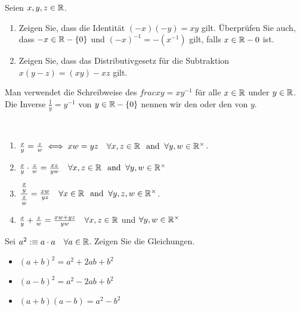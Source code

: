 \begin{imp-ex}
  Seien $x,y,z \in \mathbb{R}$.
  \begin{enumerate}
    \item Zeigen Sie, dass die Identität $(-x)(-y)=xy$ gilt. Überprüfen Sie auch, dass $-x \in \mathbb{R} - \{0\}$ und $(-x)^{-1} = -(x^{-1})$ gilt, falls $x \in \mathbb{R}-{0}$ ist.
    \item Zeigen Sie, dass das Distributivgesetz für die Subtraktion $x(y-z) = (xy)-xz$ gilt.
  \end{enumerate}
\end{imp-ex}

Man verwendet die Schreibweise des  $frac{x}{y}=xy^{-1}$ für alle  $x \in \mathbb{R}$ under  $y \in \mathbb{R}$. Die Inverse $\frac{1}{y}=y^{-1}$ von $y \in \mathbb{R}-\{0\}$ nennen wir den  oder den  von $y$.

\begin{imp-ex} 
  \phantom{.} \\
  \begin{enumerate}
    \item $\tfrac{x}{y}=\tfrac{z}{w} \iff xw = yz \quad \forall x,z \in \mathbb{R} \;\;\, \text{and}\;\; \forall y,w \in \mathbb{R}^{\times}$.
    \item $\tfrac{x}{y} \cdot \tfrac{z}{w} = \tfrac{xz}{yw} \quad \forall x,z \in \mathbb{R} \;\;\, \text{and}\;\; \forall y,w \in \mathbb{R}^{\times}$
    \item $\dfrac{\tfrac{x}{y}}{\tfrac{z}{w}} = \tfrac{xw}{yz} \quad \forall x \in \mathbb{R} \;\;\, \text{and}\;\; \forall y,z,w \in \mathbb{R}^{\times}$.
    \item $\tfrac{x}{y} + \tfrac{z}{w} = \tfrac{xw + yz}{yw} \quad \forall x,z \in \mathbb{R}$ und $\forall y,w \in \mathbb{R}^{\times}$
  \end{enumerate}
\end{imp-ex}

\begin{imp-ex}
  Sei $a^2 :\equiv a \cdot a \quad \forall a \in \mathbb{R}$. Zeigen Sie die Gleichungen.
  \begin{itemize}
    \item $(a+b)^2 = a^2 + 2ab + b^2$
    \item $(a-b)^2 = a^2 -2ab + b^2$
    \item $(a+b)(a-b)=a^2-b^2$
  \end{itemize}

\end{imp-ex}

